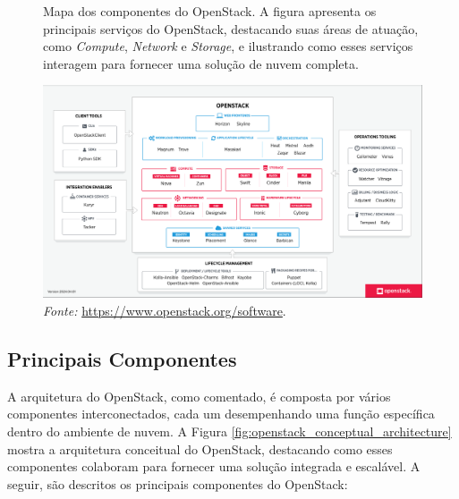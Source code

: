 \begin{figure}[htbp]
    \centering
    \caption{Mapa dos componentes do OpenStack. A figura apresenta os principais serviços do OpenStack, destacando suas áreas de atuação, como \textit{Compute}, \textit{Network} e \textit{Storage}, e ilustrando como esses serviços interagem para fornecer uma solução de nuvem completa.}
    \includegraphics[width=1.0\textwidth]{images/map_openstack.png}
    \caption*{\textit{Fonte:} \url{https://www.openstack.org/software}.}
    \label{fig:map_openstack}
\end{figure}


\subsection{Principais Componentes}

A arquitetura do OpenStack, como comentado, é composta por vários componentes interconectados, cada um desempenhando uma função específica dentro do ambiente de nuvem. A Figura \ref{fig:openstack_conceptual_architecture} mostra a arquitetura conceitual do OpenStack, destacando como esses componentes colaboram para fornecer uma solução integrada e escalável. A seguir, são descritos os principais componentes do OpenStack:

